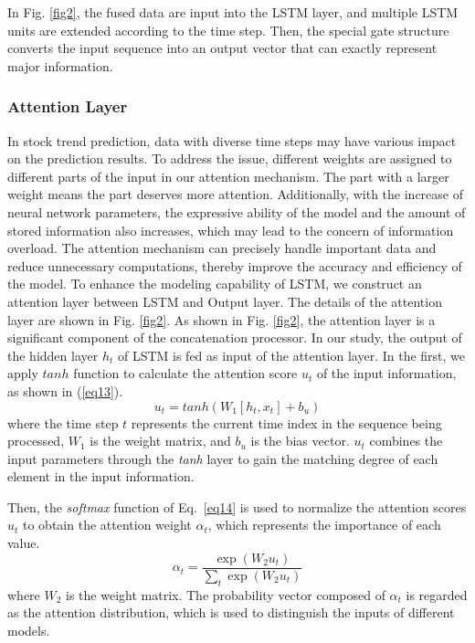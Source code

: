 \documentclass[sn-mathphys]{sn-jnl}%
\theoremstyle{thmstyleone}%
\theoremstyle{thmstyletwo}%
\theoremstyle{thmstylethree}%
\begin{document}
In Fig. \ref{fig2}, the fused data are input into the LSTM layer, and multiple LSTM units are extended according to the time step. Then, the special gate structure converts the input sequence into an output vector that can exactly represent major information.

\subsubsection{Attention Layer}\label{Attention Layer}
In stock trend prediction, data with diverse time steps may have various impact on the prediction results\cite{RN159}. To address the issue, different weights are assigned to different parts of the input in our attention mechanism. The part with a larger weight means the part deserves more attention. Additionally, with the increase of neural network parameters, the expressive ability of the model and the amount of stored information also increases, which may lead to the concern of information overload. The attention mechanism can precisely handle important data and reduce unnecessary computations, thereby improve the accuracy and efficiency of the model. To enhance the modeling capability of LSTM, we construct an attention layer between LSTM and Output layer. The details of the attention layer are shown in Fig. \ref{fig2}. As shown in Fig. \ref{fig2}, the attention layer is a significant component of the concatenation processor. In our study, the output of the hidden layer $h_t$ of LSTM is fed as input of the attention layer. In the first, we apply $tanh$ function to calculate the attention score $u_t$ of the input information, as shown in (\ref{eq13}).
\begin{equation}
u_t=tanh \left(W_1[h_{t}, x_t]+b_u\right) \label{eq13}
\end{equation}
where the time step $t$ represents the current time index in the sequence being processed, $W_1$ is the weight matrix, and $b_u$ is the bias vector. $u_t$ combines the input parameters through the \emph{tanh} layer to gain the matching degree of each element in the input information.

Then, the \emph{softmax} function of Eq.~\ref{eq14} is used to normalize the attention scores $u_t$ to obtain the attention weight $\alpha_t$, which represents the importance of each value.
\begin{equation}
\alpha_t=\frac{\exp\left(W_2 u_t\right)}{\sum_t\exp\left(W_2 u_t\right)} \label{eq14}
\end{equation}
where $W_2$ is the weight matrix. The probability vector composed of $\alpha_t$ is regarded as the attention distribution, which is used to distinguish the inputs of different models.
\end{document}
